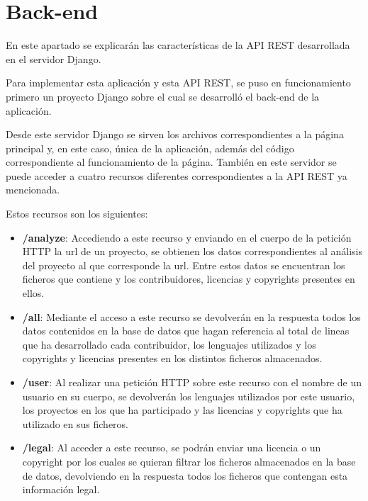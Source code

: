 \documentclass[a4paper, spanish, 12pt]{book}
\begin{document}



\section{Back-end}
\label{sec:back-end}

En este apartado se explicar\'an las caracter\'isticas de la API REST desarrollada
en el servidor Django.

Para implementar esta aplicaci\'on y esta API REST, se puso en funcionamiento
primero un proyecto Django sobre el cual se desarroll\'o el back-end de la aplicaci\'on.

Desde este servidor Django se sirven los archivos correspondientes a la p\'agina
principal y, en este caso, \'unica de la aplicaci\'on, adem\'as del c\'odigo correspondiente
al funcionamiento de la p\'agina. Tambi\'en en este servidor se puede acceder a
cuatro recursos diferentes correspondientes a la API REST ya mencionada.

Estos recursos son los siguientes:

\begin{itemize}
  \item \textbf{/analyze}: Accediendo a este recurso y enviando en el cuerpo de
  la petici\'on HTTP la url de un proyecto, se obtienen los datos correspondientes
  al an\'alisis del proyecto al que corresponde la url. Entre estos datos se
  encuentran los ficheros que contiene y los contribuidores, licencias y
  copyrights presentes en ellos.

  \item \textbf{/all}: Mediante el acceso a este recurso se devolver\'an en la
  respuesta todos los datos contenidos en la base de datos que hagan referencia
  al total de lineas que ha desarrollado cada contribuidor, los lenguajes utilizados
  y los copyrights y licencias presentes en los distintos ficheros almacenados.

  \item \textbf{/user}: Al realizar una petici\'on HTTP sobre este recurso con
  el nombre de un usuario en su cuerpo, se devolver\'an los lenguajes utilizados
  por este usuario, los proyectos en los que ha participado y las licencias y
  copyrights que ha utilizado en sus ficheros.

  \item \textbf{/legal}: Al acceder a este recurso, se podr\'an enviar una licencia
  o un copyright por los cuales se quieran filtrar los ficheros almacenados en la
  base de datos, devolviendo en la respuesta todos los ficheros que contengan
  esta informaci\'on legal.

\end{itemize}
\end{document}
